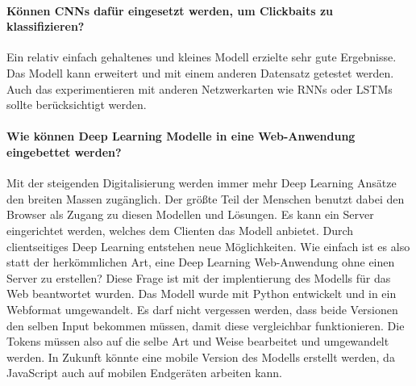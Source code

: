 \paragraph{Können CNNs dafür eingesetzt werden, um Clickbaits zu klassifizieren?}
Ein relativ einfach gehaltenes und kleines Modell erzielte sehr gute Ergebnisse. Das Modell kann erweitert und mit einem anderen Datensatz getestet werden. Auch das experimentieren mit anderen Netzwerkarten wie RNNs oder LSTMs sollte berücksichtigt werden.


\paragraph{Wie können Deep Learning Modelle in eine Web-Anwendung eingebettet werden?}

Mit der steigenden Digitalisierung werden immer mehr Deep Learning Ansätze den breiten Massen zugänglich. Der größte Teil der Menschen benutzt dabei den Browser als Zugang zu diesen Modellen und Lösungen. Es kann ein Server eingerichtet werden, welches dem Clienten das Modell anbietet. Durch clientseitiges Deep Learning entstehen neue Möglichkeiten. Wie einfach ist es also statt der herkömmlichen Art, eine Deep Learning Web-Anwendung ohne einen Server zu erstellen? Diese Frage ist mit der implentierung des Modells für das Web beantwortet wurden. Das Modell wurde mit Python entwickelt und in ein Webformat umgewandelt. Es darf nicht vergessen werden, dass beide Versionen den selben Input bekommen müssen, damit diese vergleichbar funktionieren. Die Tokens müssen also auf die selbe Art und Weise bearbeitet und umgewandelt werden. In Zukunft könnte eine mobile Version des Modells erstellt werden, da JavaScript auch auf mobilen Endgeräten arbeiten kann. 




